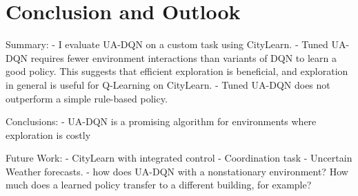 
\chapter{Conclusion and Outlook}
  \label{conclusion}


Summary:
- I evaluate UA-DQN on a custom task using CityLearn.
- Tuned UA-DQN requires fewer environment interactions than variants of DQN to learn a good policy. This suggests that efficient exploration is beneficial, and exploration in general is useful for Q-Learning on CityLearn.
- Tuned UA-DQN does not outperform a simple rule-based policy.

Conclusions:
- UA-DQN is a promising algorithm for environments where exploration is costly

Future Work:
- CityLearn with integrated control
- Coordination task
- Uncertain Weather forecasts.
- how does UA-DQN with a nonstationary environment? How much does a learned policy transfer to a different building, for example?